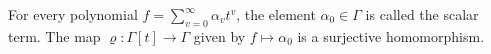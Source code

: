 For every polynomial $f = \sum_{v=0}^{\infty} \alpha_v t^v$, the element $\alpha_0 \in \Gamma$ is called the scalar term. The map $\varrho: \Gamma[t] \to \Gamma$ given by $f \mapsto \alpha_0$ is a surjective homomorphism.
